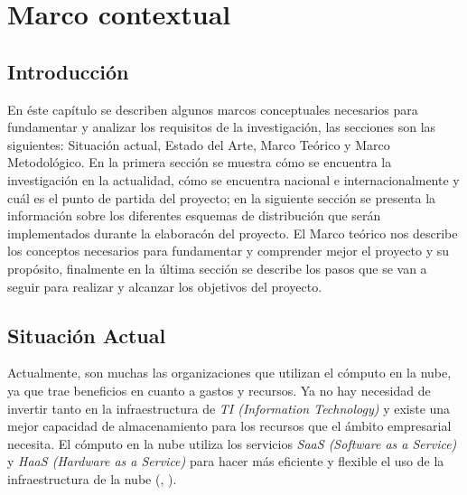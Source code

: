 
\chead{}
\rhead{\thepage}

\chapter{Marco contextual}
\section*{Introducci\'on}

En \'este cap\'itulo se describen algunos marcos conceptuales necesarios para fundamentar y analizar los requisitos de la investigaci\'on, las secciones son las siguientes: Situaci\'on actual, Estado del Arte, Marco Te\'orico y Marco Metodol\'ogico. En la primera secci\'on se muestra c\'omo se encuentra la investigaci\'on en la actualidad, c\'omo se encuentra nacional e internacionalmente y cu\'al es el punto de partida del proyecto; en la siguiente secci\'on se presenta la informaci\'on sobre los diferentes esquemas de distribuci\'on que ser\'an implementados durante la elaborac\'on del proyecto. El Marco te\'orico nos describe los conceptos necesarios para fundamentar y comprender mejor el proyecto y su prop\'osito, finalmente en la \'ultima secci\'on se describe los pasos que se van a seguir para realizar y alcanzar los objetivos del proyecto.

\newpage


\section{Situaci\'on Actual}

Actualmente, son muchas las organizaciones que utilizan el c\'omputo en la nube, ya que trae beneficios en cuanto a gastos y recursos. Ya no hay necesidad de invertir tanto en la infraestructura de \textit{TI (Information Technology)} y existe una mejor capacidad de almacenamiento para los recursos que el \'ambito empresarial necesita.
El c\'omputo en la nube utiliza los servicios \textit{SaaS (Software as a Service)} y \textit{HaaS (Hardware as a Service)} para hacer m\'as eficiente y flexible el uso de la infraestructura de la nube (\citeauthor{mariscal2013computo}, \citeyear{mariscal2013computo}). 


